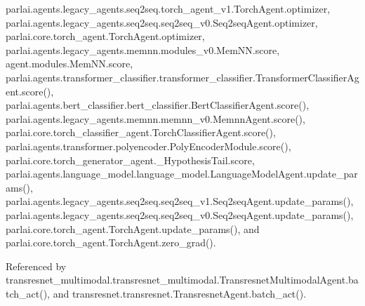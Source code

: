 parlai.\+agents.\+legacy\+\_\+agents.\+seq2seq.\+torch\+\_\+agent\+\_\+v1.\+Torch\+Agent.\+optimizer, parlai.\+agents.\+legacy\+\_\+agents.\+seq2seq.\+seq2seq\+\_\+v0.\+Seq2seq\+Agent.\+optimizer, parlai.\+core.\+torch\+\_\+agent.\+Torch\+Agent.\+optimizer, parlai.\+agents.\+legacy\+\_\+agents.\+memnn.\+modules\+\_\+v0.\+Mem\+N\+N.\+score, agent.\+modules.\+Mem\+N\+N.\+score, parlai.\+agents.\+transformer\+\_\+classifier.\+transformer\+\_\+classifier.\+Transformer\+Classifier\+Agent.\+score(), parlai.\+agents.\+bert\+\_\+classifier.\+bert\+\_\+classifier.\+Bert\+Classifier\+Agent.\+score(), parlai.\+agents.\+legacy\+\_\+agents.\+memnn.\+memnn\+\_\+v0.\+Memnn\+Agent.\+score(), parlai.\+core.\+torch\+\_\+classifier\+\_\+agent.\+Torch\+Classifier\+Agent.\+score(), parlai.\+agents.\+transformer.\+polyencoder.\+Poly\+Encoder\+Module.\+score(), parlai.\+core.\+torch\+\_\+generator\+\_\+agent.\+\_\+\+Hypothesis\+Tail.\+score, parlai.\+agents.\+language\+\_\+model.\+language\+\_\+model.\+Language\+Model\+Agent.\+update\+\_\+params(), parlai.\+agents.\+legacy\+\_\+agents.\+seq2seq.\+seq2seq\+\_\+v1.\+Seq2seq\+Agent.\+update\+\_\+params(), parlai.\+agents.\+legacy\+\_\+agents.\+seq2seq.\+seq2seq\+\_\+v0.\+Seq2seq\+Agent.\+update\+\_\+params(), parlai.\+core.\+torch\+\_\+agent.\+Torch\+Agent.\+update\+\_\+params(), and parlai.\+core.\+torch\+\_\+agent.\+Torch\+Agent.\+zero\+\_\+grad().



Referenced by transresnet\+\_\+multimodal.\+transresnet\+\_\+multimodal.\+Transresnet\+Multimodal\+Agent.\+batch\+\_\+act(), and transresnet.\+transresnet.\+Transresnet\+Agent.\+batch\+\_\+act().

